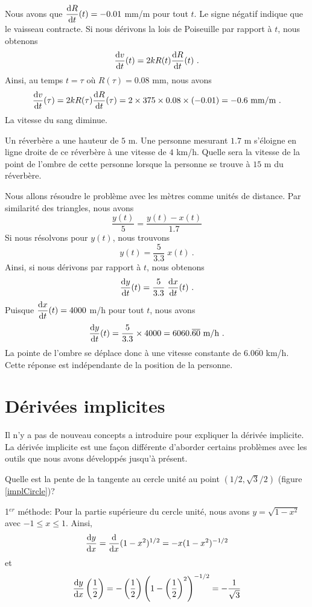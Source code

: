 {\begin{egg}
Nous avons que $\DS \dydx{R}{t}(t) = -0.01$ mm/m pour tout $t$.
Le signe négatif indique que le vaisseau contracte.  Si nous dérivons la
lois de Poiseuille par rapport à $t$, nous obtenons
\[
\dydx{v}{t}(t) = 2k R(t) \dydx{R}{t}(t) \ .
\]
Ainsi, au temps $t = \tau$ où $R(\tau) = 0.08$ mm, nous avons
\[
\dydx{v}{t}(\tau) = 2k R(\tau) \dydx{R}{t}(\tau) 
= 2\times 375\times 0.08 \times (-0.01) = -0.6 \ \text{mm/m} \ .
\]
La vitesse du sang diminue.
\end{egg}

\begin{egg}
Un réverbère a une hauteur de $5$ m.  Une personne mesurant $1.7$ m
s'éloigne en ligne droite de ce réverbère à une vitesse de $4$ km/h.
Quelle sera la vitesse de la point de l'ombre de cette personne
lorsque la personne se trouve à $15$ m du réverbère.

Nous allons résoudre le problème avec les mètres comme unités de distance.
Par similarité des triangles, nous avons
\[
\frac{y(t)}{5} = \frac{y(t)-x(t)}{1.7}
\]
Si nous résolvons pour $y(t)$, nous trouvons
\[
y(t) = \frac{5}{3.3}\; x(t) \ .
\]
Ainsi, si nous dérivons par rapport à $t$, nous obtenons
\[
\dydx{y}{t}(t) = \frac{5}{3.3} \; \dydx{x}{t}(t) \ .
\]
Puisque $\DS \dydx{x}{t}(t) = 4000$ m/h pour tout $t$, nous avons
\[
\dydx{y}{t}(t) = \frac{5}{3.3} \times 4000 = 6060.\overline{60}
\ \text{m/h} \ .
\]
La pointe de l'ombre se déplace donc à une vitesse constante de
$6.0\overline{60}$ km/h.  Cette réponse est indépendante de la
position de la personne.
\end{egg}

\section{Dérivées implicites \eng}

Il n'y a pas de nouveau concepts a introduire pour expliquer la
dérivée implicite.  La dérivée implicite est une façon
différente d'aborder certains problèmes avec les outils que nous
avons développés jusqu'à présent.

\begin{egg}
Quelle est la pente de la tangente au cercle unité au point
$(1/2, \sqrt{3}/2)$ (figure \ref{implCircle})?

1$^{er}$ méthode: Pour la partie supérieure du cercle unité, nous avons
$y = \sqrt{1-x^2}$ avec $-1 \leq x \leq 1$.  Ainsi,
\[
\dydx{y}{x} = \dfdx{(1-x^2)^{1/2}}{x} = -x (1-x^2)^{-1/2}
\]
et
\[
\dydx{y}{x}\left(\frac{1}{2}\right)
= -\left(\frac{1}{2}\right) \left(1-\left(\frac{1}{2}\right)^2\right)^{-1/2}
= - \frac{1}{\sqrt{3}}
\]


\end{egg}}

